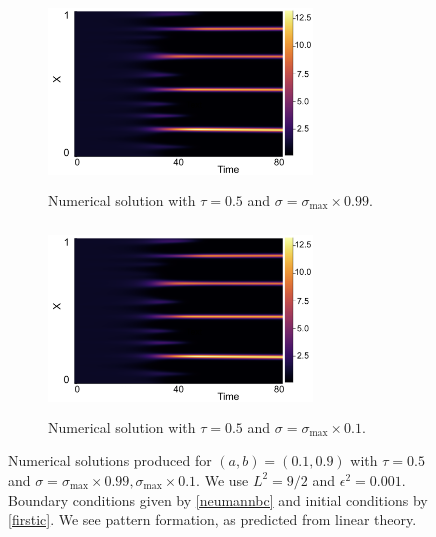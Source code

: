 \begin{figure}[H]
    \centering
    \begin{subfigure}[t]{0.45\textwidth}
        \centering
        \includegraphics[width=7cm,height=5cm]{applin1.png}
        \caption{Numerical solution with $\tau=0.5$ and $\sigma=\sigma_{\max}\times0.99$.}
        \label{}
    \end{subfigure}
    \hfill
    \begin{subfigure}[t]{0.45\textwidth}
        \centering
        \includegraphics[width=7cm,height=5cm]{applin1.png}
        \caption{Numerical solution with $\tau=0.5$ and $\sigma=\sigma_{\max}\times0.1$.}
        \label{}
    \end{subfigure}
    \caption{Numerical solutions produced for $(a,b)=(0.1,0.9)$ with $\tau=0.5$ and $\sigma=\sigma_{\max}\times0.99, \sigma_{\max}\times0.1$. We use $L^2=9/2$ and $\epsilon^2=0.001$. Boundary conditions given by \eqref{neumannbc} and initial conditions by \eqref{firstic}. We see pattern formation, as predicted from linear theory.}
    \label{fig:linapp1}
\end{figure}

